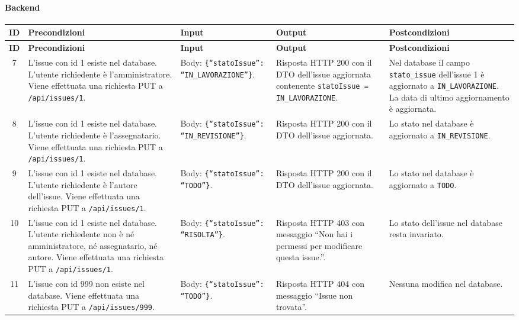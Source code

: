 \paragraph{Backend}

{
\small
\begin{longtable}{|c|p{3.8cm}|p{3.8cm}|p{3.8cm}|p{3.8cm}|}
\hline
\textbf{ID} & \textbf{Precondizioni} & \textbf{Input} & \textbf{Output} & \textbf{Postcondizioni} \\
\hline
\endfirsthead
\hline
\textbf{ID} & \textbf{Precondizioni} & \textbf{Input} & \textbf{Output} & \textbf{Postcondizioni} \\
\hline
\endhead
7 &
L'issue con id 1 esiste nel database. L'utente richiedente \`e l'amministratore. Viene effettuata una richiesta PUT a \texttt{/api/issues/1}. &
Body: \texttt{\{``statoIssue'': ``IN\_LAVORAZIONE''\}}. &
Risposta HTTP 200 con il DTO dell'issue aggiornata contenente \texttt{statoIssue = IN\_LAVORAZIONE}. &
Nel database il campo \texttt{stato\_issue} dell'issue 1 \`e aggiornato a \texttt{IN\_LAVORAZIONE}. La data di ultimo aggiornamento \`e aggiornata. \\
\hline
8 &
L'issue con id 1 esiste nel database. L'utente richiedente \`e l'assegnatario. Viene effettuata una richiesta PUT a \texttt{/api/issues/1}. &
Body: \texttt{\{``statoIssue'': ``IN\_REVISIONE''\}}. &
Risposta HTTP 200 con il DTO dell'issue aggiornata. &
Lo stato nel database \`e aggiornato a \texttt{IN\_REVISIONE}. \\
\hline
9 &
L'issue con id 1 esiste nel database. L'utente richiedente \`e l'autore dell'issue. Viene effettuata una richiesta PUT a \texttt{/api/issues/1}. &
Body: \texttt{\{``statoIssue'': ``TODO''\}}. &
Risposta HTTP 200 con il DTO dell'issue aggiornata. &
Lo stato nel database \`e aggiornato a \texttt{TODO}. \\
\hline
10 &
L'issue con id 1 esiste nel database. L'utente richiedente non \`e n\'e amministratore, n\'e assegnatario, n\'e autore. Viene effettuata una richiesta PUT a \texttt{/api/issues/1}. &
Body: \texttt{\{``statoIssue'': ``RISOLTA''\}}. &
Risposta HTTP 403 con messaggio ``Non hai i permessi per modificare questa issue.''. &
Lo stato dell'issue nel database resta invariato. \\
\hline
11 &
L'issue con id 999 non esiste nel database. Viene effettuata una richiesta PUT a \texttt{/api/issues/999}. &
Body: \texttt{\{``statoIssue'': ``TODO''\}}. &
Risposta HTTP 404 con messaggio ``Issue non trovata''. &
Nessuna modifica nel database. \\
\hline
\end{longtable}
}

